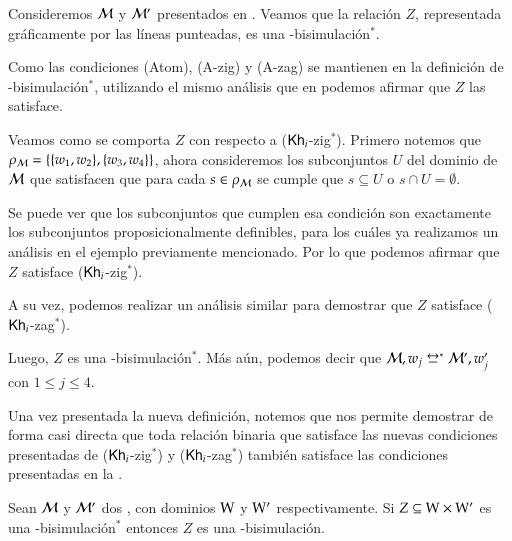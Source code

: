 \begin{ejemplo}\label{ejemplo:bisim^*}
    Consideremos $\mathcal{M}$ y $\mathcal{M}'$ presentados en . Veamos que la relación $Z$, representada 
    gráficamente por las líneas punteadas, es una \KHilogic-bisimulación$^*$. 

    Como las condiciones (Atom), (A-zig) y (A-zag) se mantienen en la definición de \KHilogic-bisimulación$^*$, utilizando el mismo 
    análisis que en  podemos afirmar que $Z$ las satisface.

    Veamos como se comporta $Z$ con respecto a ($\mathsf{Kh}_i$-zig$^*$). Primero notemos que $\rho_{\mathcal{M}} = \{\{w_1,w_2\}, \{w_3,w_4\}\}$, ahora 
    consideremos los subconjuntos $U$ del dominio de $\mathcal{M}$ que satisfacen que para cada $s \in \rho_{\mathcal{M}}$ se cumple que 
    $s \subseteq U$ o $s \cap U = \emptyset$. 
    
    Se puede ver que los subconjuntos que cumplen esa condición son exactamente los subconjuntos 
    proposicionalmente definibles, para los cuáles ya realizamos un análisis en el ejemplo previamente mencionado. 
    Por lo que podemos afirmar que $Z$ satisface ($\mathsf{Kh}_i$-zig$^*$).
    
    A su vez, podemos realizar un análisis similar para demostrar que $Z$ satisface ($\mathsf{Kh}_i$-zag$^*$). 

    Luego, $Z$ es una \KHilogic-bisimulación$^*$. Más aún, podemos decir que $\modults,w_j \bisim^* \modults',w_j'$ con $1 \leq j \leq 4$.
\end{ejemplo}


Una vez presentada la nueva definición, notemos que  nos permite demostrar de forma casi directa que
toda relación binaria que satisface las nuevas condiciones presentadas de ($\mathsf{Kh}_i$-zig$^*$) y ($\mathsf{Kh}_i$-zag$^*$) también satisface las condiciones
presentadas en la .

\begin{lema}\label{lema:new-implies-old}
    Sean $\mathcal{M}$ y $\mathcal{M}'$ dos \ultss, con dominios $\mathrm{W}$ y $\mathrm{W}'$ respectivamente. Si $Z \subseteq \mathrm{W} \times \mathrm{W}'$ es una \KHilogic-bisimulación$^*$ entonces $Z$ es una \KHilogic-bisimulación.
\end{lema}

